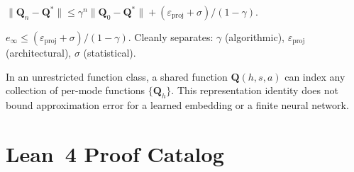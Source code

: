 \begin{theorem}
$\|\mathbf{Q}_n - \mathbf{Q}^*\| \le \gamma^n \|\mathbf{Q}_0 - \mathbf{Q}^*\| + (\varepsilon_{\mathrm{proj}} + \sigma)/(1{-}\gamma)$.
\end{theorem}

\begin{corollary}
$e_\infty \le (\varepsilon_{\mathrm{proj}} + \sigma)/(1{-}\gamma)$.  Cleanly separates: $\gamma$ (algorithmic), $\varepsilon_{\mathrm{proj}}$ (architectural), $\sigma$ (statistical).
\end{corollary}

\begin{theorem}
In an unrestricted function class, a shared function $\mathbf Q(h,s,a)$ can index any collection of per-mode functions $\{\mathbf Q_h\}$. This representation identity does not bound approximation error for a learned embedding or a finite neural network.
\end{theorem}


\section{Lean~4 Proof Catalog}
\label{app:lean}

